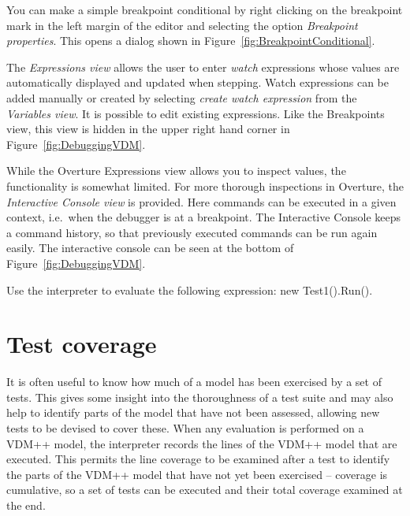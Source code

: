 You can make a simple breakpoint conditional by right clicking on the
breakpoint mark in the left margin of the editor and selecting the
option \emph{Breakpoint properties}. This opens a dialog shown in
Figure~\ref{fig:BreakpointConditional}.

The \emph{Expressions view} allows the user to enter \emph{watch}
expressions whose values are automatically displayed and updated when
stepping. Watch expressions can be added manually or created by
selecting \emph{create watch expression} from the \emph{Variables view}. It
is possible to edit existing expressions.  Like the Breakpoints view,
this view is hidden in the upper right hand corner in
Figure~\ref{fig:DebuggingVDM}.

While the Overture Expressions view allows you to inspect values, the
functionality is somewhat limited. For more thorough inspections in
Overture, the \emph{Interactive Console view} is provided. Here
commands can be executed in a given context, i.e.\ when the debugger
is at a breakpoint. The Interactive Console keeps a command history,
so that previously executed commands can be run again easily. The
interactive console can be seen at the bottom of
Figure~\ref{fig:DebuggingVDM}.


\begin{myexercise}
\label{ex:tool-monitor}Use the interpreter to evaluate the
  following expression: {\ttfamily new Test1().Run()}.
\end{myexercise}



\section{Test coverage}\label{sec:testcov}

It is often useful to know how much of a model has been exercised by a
set of tests. This gives some insight into the thoroughness of a test
suite and may also help to identify parts of the model that have not
been assessed, allowing new tests to be devised to cover these. When
any evaluation is performed on a VDM++ model, the interpreter records
the lines of the VDM++ model that are executed. This permits the line
coverage to be examined after a test to identify the parts of the
VDM++ model that have not yet been exercised -- coverage is
cumulative, so a set of tests can be executed and their total coverage
examined at the end.

